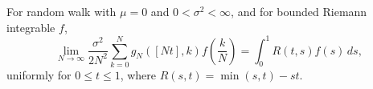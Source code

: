 For random walk with \(\mu = 0\) and \(0 < \sigma^2 < \infty\), and for bounded Riemann integrable \(f\),
\[
\lim_{N \to \infty} \frac{\sigma^2}{2N^2} \sum_{k=0}^{N} g_N([Nt],k) f\!\left(\frac{k}{N}\right) = \int_0^1 R(t,s) f(s) \, ds,
\]
uniformly for \(0 \leq t \leq 1\), where \(R(s,t) = \min(s,t) - st\).
